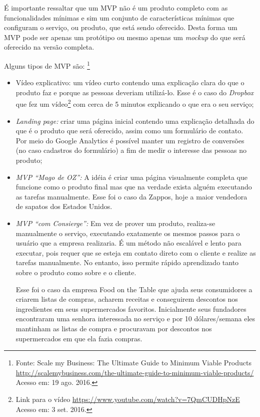     \par É importante ressaltar que um MVP não é um produto completo com as funcionalidades mínimas e sim um conjunto de características mínimas que configuram o serviço, ou produto, que está sendo oferecido. Desta forma um MVP pode ser apenas um protótipo ou mesmo apenas um \emph{mockup} do que será oferecido na versão completa.
    \par Alguns tipos de MVP são: \footnote{ Fonte: Scale my Business: The Ultimate Guide to Minimum Viable Products  \url{http://scalemybusiness.com/the-ultimate-guide-to-minimum-viable-products/} Acesso em: 19 ago. 2016.}
\begin{itemize}
\item Vídeo explicativo: um vídeo curto contendo uma explicação clara do que o produto faz e porque as pessoas deveriam utilizá-lo. Esse é o caso do \emph{Dropbox} que fez um vídeo\footnote{Link para o vídeo  \url{https://www.youtube.com/watch?v=7QmCUDHpNzE} Acesso em: 3 set. 2016.} com cerca de 5 minutos explicando o que era o seu serviço;
\item \emph{Landing page:}
criar uma página inicial contendo uma explicação detalhada do que é o produto que será oferecido, assim como um formulário de contato. Por meio do Google Analytics é possível manter um registro de conversões (no caso cadastros do formulário) a fim de medir o interesse das pessoas no produto;
\item \emph{MVP ``Mago de OZ'':}
A idéia é criar uma página visualmente completa que funcione como o produto final mas que na verdade exista alguém executando as tarefas manualmente. Esse foi o caso da Zappos, hoje a maior vendedora de sapatos dos Estados Unidos.
\item \emph{ MVP ``com Consierge'':}
Em vez de prover um produto, realiza-se manualmente o serviço, executando exatamente os mesmos passos para o usuário que a empresa realizaria. É um método não escalável e lento para executar, pois requer que se esteja em contato direto com o cliente e realize as tarefas manualmente. No entanto, isso permite rápido aprendizado tanto sobre o produto como sobre e o cliente.
\par Esse foi o caso da empresa Food on the Table que ajuda seus consumidores a criarem listas de compras, acharem receitas e conseguirem descontos nos ingredientes em seus supermercados favoritos. Inicialmente seus fundadores encontraram uma senhora interessada no serviço e por 10 dólares/semana eles mantinham as listas de compra e procuravam por descontos nos supermercados em que ela fazia compras.
\end{itemize}

